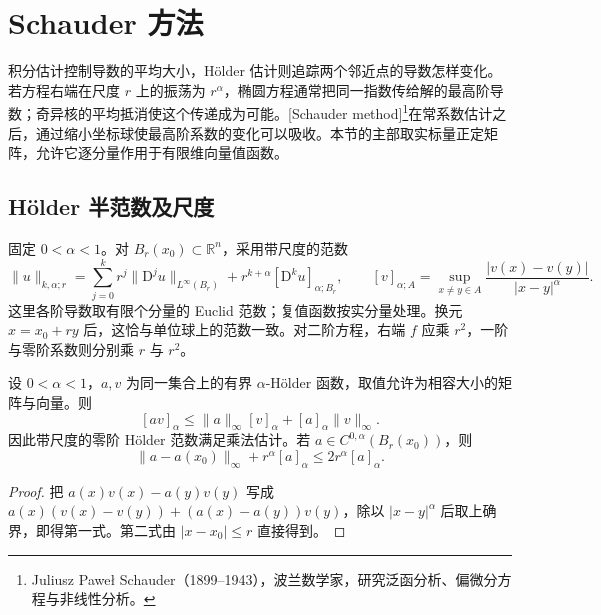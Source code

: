 
% 
% 

\section{Schauder 方法}
\label{g3:sec:1205}

积分估计控制导数的平均大小，Hölder 估计则追踪两个邻近点的导数怎样变化。若方程右端在尺度 \(r\) 上的振荡为 \(r^\alpha\)，椭圆方程通常把同一指数传给解的最高阶导数；奇异核的平均抵消使这个传递成为可能。[Schauder method]\footnote{Juliusz Paweł Schauder（1899--1943），波兰数学家，研究泛函分析、偏微分方程与非线性分析。}在常系数估计之后，通过缩小坐标球使最高阶系数的变化可以吸收。本节的主部取实标量正定矩阵，允许它逐分量作用于有限维向量值函数。

\subsection{Hölder 半范数及尺度}
\label{g3:subsec:1205:01}
固定 \(0<\alpha<1\)。对 \(B_r(x_0)\subset\mathbb R^n\)，采用带尺度的范数
\[
	\|u\|_{k,\alpha;r}
	=\sum_{j=0}^k r^j\|\mathrm D^ju\|_{L^\infty(B_r)}
	+r^{k+\alpha}[\mathrm D^ku]_{\alpha;B_r},
	\qquad
	[v]_{\alpha;A}=\sup_{x\ne y\in A}\frac{|v(x)-v(y)|}{|x-y|^\alpha}.
\]
这里各阶导数取有限个分量的 Euclid 范数；复值函数按实分量处理。换元 \(x=x_0+ry\) 后，这恰与单位球上的范数一致。对二阶方程，右端 \(f\) 应乘 \(r^2\)，一阶与零阶系数则分别乘 \(r\) 与 \(r^2\)。

\begin{lemma}\label{g3:lem:holder-product-scale}
	设 \(0<\alpha<1\)，\(a,v\) 为同一集合上的有界 \(\alpha\)-Hölder 函数，取值允许为相容大小的矩阵与向量。则
	\[
		[av]_\alpha\le\|a\|_\infty[v]_\alpha+[a]_\alpha\|v\|_\infty.
	\]
	因此带尺度的零阶 Hölder 范数满足乘法估计。若 \(a\in C^{0,\alpha}(B_r(x_0))\)，则
	\[
		\|a-a(x_0)\|_\infty+r^\alpha[a]_\alpha
		\le2r^\alpha[a]_\alpha.
	\]
\end{lemma}
\begin{proof}
	把 \(a(x)v(x)-a(y)v(y)\) 写成
	\(a(x)(v(x)-v(y))+(a(x)-a(y))v(y)\)，除以 \(|x-y|^\alpha\) 后取上确界，即得第一式。第二式由 \(|x-x_0|\le r\) 直接得到。
\end{proof}

